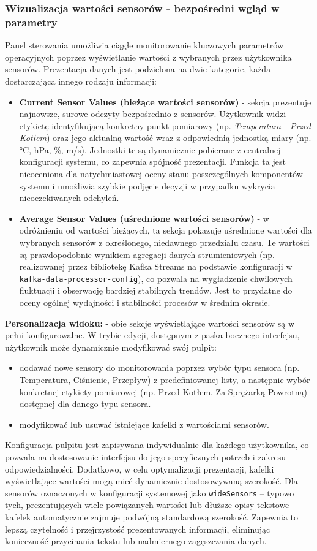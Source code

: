 \subsubsection{Wizualizacja wartości sensorów - bezpośredni wgląd w parametry}
Panel sterowania umożliwia ciągłe monitorowanie kluczowych parametrów operacyjnych poprzez wyświetlanie wartości z wybranych przez użytkownika sensorów. Prezentacja danych jest podzielona na dwie kategorie, każda dostarczająca innego rodzaju informacji:
\begin{itemize}
    \item \textbf{Current Sensor Values (bieżące wartości sensorów)} - sekcja prezentuje najnowsze, surowe odczyty bezpośrednio z sensorów. Użytkownik widzi etykietę identyfikującą konkretny punkt pomiarowy (np. \textit{Temperatura - Przed Kotłem}) oraz jego aktualną wartość wraz z odpowiednią jednostką miary (np. °C, hPa, \%, m/s). Jednostki te są dynamicznie pobierane z centralnej konfiguracji systemu, co zapewnia spójność prezentacji. Funkcja ta jest nieoceniona dla natychmiastowej oceny stanu poszczególnych komponentów systemu i umożliwia szybkie podjęcie decyzji w przypadku wykrycia nieoczekiwanych odchyleń.
    \item \textbf{Average Sensor Values (uśrednione wartości sensorów)} - w odróżnieniu od wartości bieżących, ta sekcja pokazuje uśrednione wartości dla wybranych sensorów z określonego, niedawnego przedziału czasu. Te wartości są prawdopodobnie wynikiem agregacji danych strumieniowych (np. realizowanej przez bibliotekę Kafka Streams na podstawie konfiguracji w \texttt{kafka-data-processor-config}), co pozwala na wygładzenie chwilowych fluktuacji i obserwację bardziej stabilnych trendów. Jest to przydatne do oceny ogólnej wydajności i stabilności procesów w średnim okresie.
\end{itemize}
\textbf{Personalizacja widoku:} - obie sekcje wyświetlające wartości sensorów są w pełni konfigurowalne. W trybie edycji, dostępnym z paska bocznego interfejsu, użytkownik może dynamicznie modyfikować swój pulpit:
\begin{itemize}
    \item dodawać nowe sensory do monitorowania poprzez wybór typu sensora (np. Temperatura, Ciśnienie, Przepływ) z predefiniowanej listy, a następnie wybór konkretnej etykiety pomiarowej (np. Przed Kotłem, Za Sprężarką Powrotną) dostępnej dla danego typu sensora.
    \item modyfikować lub usuwać istniejące kafelki z wartościami sensorów.
\end{itemize}
Konfiguracja pulpitu jest zapisywana indywidualnie dla każdego użytkownika, co pozwala na dostosowanie interfejsu do jego specyficznych potrzeb i zakresu odpowiedzialności. Dodatkowo, w celu optymalizacji prezentacji, kafelki wyświetlające wartości mogą mieć dynamicznie dostosowywaną szerokość. Dla sensorów oznaczonych w konfiguracji systemowej jako \texttt{wideSensors} – typowo tych, prezentujących wiele powiązanych wartości lub dłuższe opisy tekstowe – kafelek automatycznie zajmuje podwójną standardową szerokość. Zapewnia to lepszą czytelność i przejrzystość prezentowanych informacji, eliminując konieczność przycinania tekstu lub nadmiernego zagęszczania danych.

